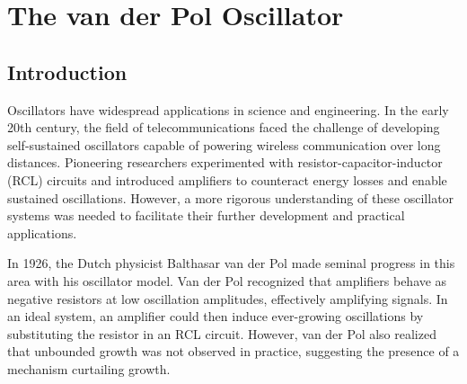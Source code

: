 \chapter{The van der Pol Oscillator}
\label{ch19} 




\vspace{1cm}

\section{Introduction}

Oscillators have widespread applications in science and engineering. In the early 20th century, the field of telecommunications faced the challenge of developing self-sustained oscillators capable of powering wireless communication over long distances. Pioneering researchers experimented with resistor-capacitor-inductor (RCL) circuits and introduced amplifiers to counteract energy losses and enable sustained oscillations. However, a more rigorous understanding of these oscillator systems was needed to facilitate their further development and practical applications.

In 1926, the Dutch physicist Balthasar van der Pol made seminal progress in this area with his oscillator model. Van der Pol recognized that amplifiers behave as negative resistors at low oscillation amplitudes, effectively amplifying signals. In an ideal system, an amplifier could then induce ever-growing oscillations by substituting the resistor in an RCL circuit. However, van der Pol also realized that unbounded growth was not observed in practice, suggesting the presence of a mechanism curtailing growth.

